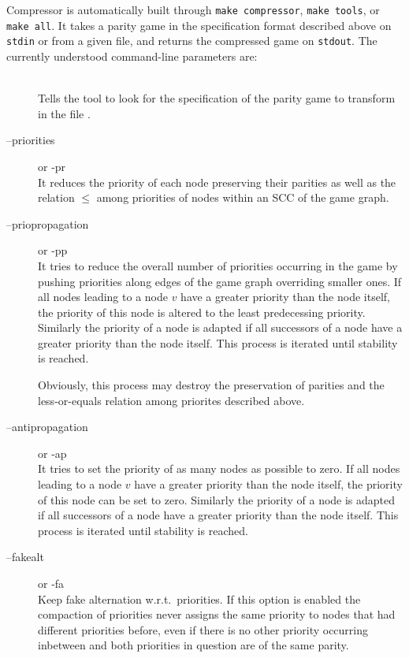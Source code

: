 Compressor is automatically built through \verb#make compressor#,
\verb#make tools#, or \verb#make all#. It takes a parity game in the specification format described above
on \texttt{stdin} or from a given file, and returns the compressed game on \texttt{stdout}. The currently
understood command-line parameters are:
\begin{description}
\item[] \ \\
   Tells the tool to look for the specification of the parity game to transform in the file
   .

\item[{\ttfamily --priorities}] \enspace or {\ttfamily -pr} \\
    It reduces the priority of each node preserving their parities as well as the relation $\le$
    among priorities of nodes within an SCC of the game graph.

\item[{\ttfamily --priopropagation}] \enspace or {\ttfamily -pp} \\
    It tries to reduce the overall number of priorities occurring in the game by pushing priorities
    along edges of the game graph overriding smaller ones. If all nodes leading to a node $v$ have a
    greater priority than the node itself, the priority of this node is altered to the least predecessing
    priority. Similarly the priority of a node is adapted if all successors of a node have a greater
    priority than the node itself. This process is iterated until stability is reached.

    Obviously, this process may destroy the preservation of parities and the less-or-equals relation among
    priorites described above.

\item[{\ttfamily --antipropagation}] \enspace or {\ttfamily -ap} \\
	It tries to set the priority of as many nodes as possible to zero. If all nodes leading to a node
	$v$ have a greater priority than the node itself, the priority of this node can be set to zero.
	Similarly the priority of a node is adapted if all successors of a node have a greater priority than
	the node itself. This process is iterated until stability is reached.

\item[{\ttfamily  --fakealt}] \enspace or {\ttfamily -fa} \\
    Keep fake alternation w.r.t.\ priorities. If this option is enabled the compaction of priorities
    never assigns the same priority to nodes that had different priorities before, even if there is
    no other priority occurring inbetween and both priorities in question are of the same parity.


\end{description}
